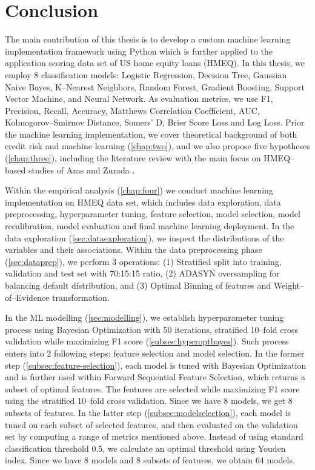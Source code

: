 \chapter{Conclusion}
\label{conclusion}

The main contribution of this thesis is to develop a custom machine learning implementation framework using Python which is further applied to the application scoring data set of US home equity loans (HMEQ).
In this thesis, we employ 8 classification models: Logistic Regression, Decision Tree, Gaussian Naive Bayes, K--Nearest Neighbors, Random Forest, Gradient Boosting, Support Vector Machine, and Neural Network. As evaluation metrics, we use F1, Precision, Recall, Accuracy, Matthews Correlation Coefficient, AUC, Kolmogorov--Smirnov Distance, Somers' D, Brier Score Loss and Log Loss.
Prior the machine learning implementation, we cover theoretical background of both credit risk and machine learning (\autoref{chap:two}), and we also propose five hypotheses (\autoref{chap:three}), including the literature review with the main focus on HMEQ--based studies of Aras \citep{serkan2021bagging} and Zurada \citep{zurada2014classification}.

Within the empirical analysis (\autoref{chap:four}) we conduct machine learning implementation on HMEQ data set, which includes data exploration, data preprocessing, hyperparameter tuning, feature selection, model selection, model recalibration, model evaluation and final machine learning deployment.
In the data exploration (\autoref{sec:dataexploration}), we inspect the distributions of the variables and their associations.
Within the data preprocessing phase (\autoref{sec:dataprep}), we perform 3 operations: (1) Stratified split into training, validation  and test set with 70:15:15 ratio, (2) ADASYN oversampling for balancing default distribution, and (3) Optimal Binning of features and Weight--of--Evidence transformation.

In the ML modelling (\autoref{sec:modelling}), we establish hyperparameter tuning process using Bayesian Optimization with 50 iterations, stratified 10--fold cross validation while maximizing F1 score (\autoref{subsec:hyperoptbayes}).
Such process enters into 2 following steps: feature selection and model selection.
In the former step (\autoref{subsec:feature-selection}), each model is tuned with Bayesian Optimization and is further used within Forward Sequential Feature Selection, which returns a subset of optimal features. The features are selected while maximizing F1 score using the stratified 10--fold cross validation. Since we have 8 models, we get 8 subsets of features.
In the latter step (\autoref{subsec:modelselection}), each model is tuned on each subset of selected features, and then evaluated on the validation set by computing a range of metrics mentioned above. Instead of using standard classification threshold 0.5, we calculate an optimal threshold using Youden index. Since we have 8 models and 8 subsets of features, we obtain 64 models.

